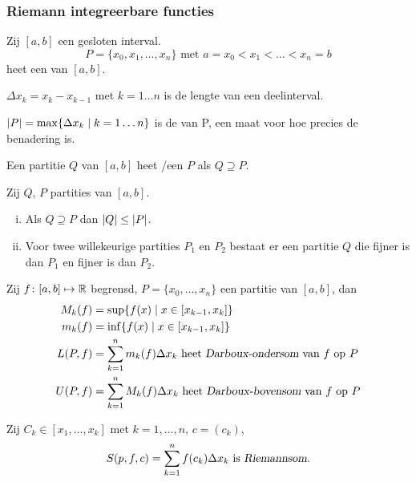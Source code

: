 \documentclass{2wa40summary}
\begin{document}
		\subsubsection{Riemann integreerbare functies}
			\begin{define}
				Zij $ [a,b] $ een gesloten interval. 
				\[ 
					P = \{ x_0,x_1,\ldots,x_n \} \text{ met } a=x_0 < x_1 < \ldots < x_n = b
				 \]
				 heet een  van $ [a,b] $.
			\end{define}
			\begin{nota}
				$ \Delta x_k = x_k - x_{k-1} $ met $ k=1\ldots n $ is de lengte van een deelinterval.
				
				$ {\left|P\right|} = \max \{ \Delta x_k \mid k=1\ldots n \} $ is de  van P, een maat voor hoe precies de benadering is.
			\end{nota}
			\begin{define}
				Een partitie $Q$ van $[a,b]$ heet /een  $P$ als $Q \supseteq P$.
			\end{define}
			\begin{lemma}
				Zij $Q$, $P$ partities van $[a,b]$.
				\begin{enumerate}[(i)]
					\item Als $Q \supseteq P$ dan $ {\left|Q\right|} \le {\left|P\right|} $.
					\item Voor twee willekeurige partities $P_1$ en $P_2$ bestaat er een partitie $Q$ die fijner is dan $P_1$ en fijner is dan $P_2$.
				\end{enumerate}
			\end{lemma}
			\begin{define}
				Zij $ f\colon [a,b] \mapsto \mathbb{R} $ begrensd, $ P = \{ x_0,\ldots,x_n \} $ een partitie van $[a,b]$, dan
				\[
				\begin{split}
					M_k (f) &= \sup \{ f(x) \mid x \in [x_{k-1},x_k] \} \\
					m_k (f) &= \inf \{ f(x) \mid x \in [x_{k-1},x_k] \} \\
					L(P,f) &= \sum_{k=1}^{n} m_k (f) \Delta x_k \text{ heet  \indx{Darboux-ondersom} van $f$ op $P$}\\
					U(P,f) &= \sum_{k=1}^{n} M_k (f) \Delta x_k \text{ heet  \indx{Darboux-bovensom} van $f$ op $P$}
				 \end{split}
				 \]
				 
				 Zij $C_k \in [x_1,\ldots,x_k]$ met $k=1,\ldots,n$, $c=(c_k)$,
				 \[ 
					 S(p,f,c) = \sum_{k=1}^{n} f(c_k) \Delta x_k \text{ is \indx{Riemannsom}.}
				  \]
			\end{define}
\end{document}
